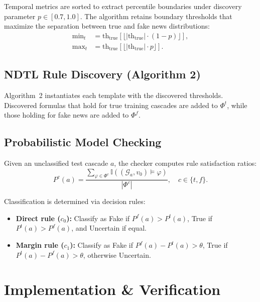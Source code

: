 \documentclass[10pt,twocolumn]{article}
\begin{document}
Temporal metrics are sorted to extract percentile boundaries under discovery parameter $p \in [0.7, 1.0]$. The algorithm retains boundary thresholds that maximize the separation between true and fake news distributions:
\begin{align}
\min\nolimits_t &= \text{th}_{\text{true}}[\lfloor |\text{th}_{\text{true}}| \cdot (1 - p) \rfloor], \\
\max\nolimits_t &= \text{th}_{\text{true}}[\lfloor |\text{th}_{\text{true}}| \cdot p \rfloor].
\end{align}

\subsection{NDTL Rule Discovery (Algorithm 2)}
Algorithm~2 instantiates each template with the discovered thresholds. Discovered formulas that hold for true training cascades are added to $\Phi^t$, while those holding for fake news are added to $\Phi^f$.

\subsection{Probabilistic Model Checking}
Given an unclassified test cascade $a$, the checker computes rule satisfaction ratios:
\begin{equation}
P^c(a) = \frac{\sum_{\varphi \in \Phi^c} \mathbb{I}((\mathcal{G}_a, v_0) \models \varphi)}{|\Phi^c|}, \quad c \in \{t, f\}.
\end{equation}

Classification is determined via decision rules:
\begin{itemize}
    \item \textbf{Direct rule ($c_0$):} Classify as Fake if $P^f(a) > P^t(a)$, True if $P^t(a) > P^f(a)$, and Uncertain if equal.
    \item \textbf{Margin rule ($c_1$):} Classify as Fake if $P^f(a) - P^t(a) > \theta$, True if $P^t(a) - P^f(a) > \theta$, otherwise Uncertain.
\end{itemize}

\section{Implementation \& Verification}
\end{document}
